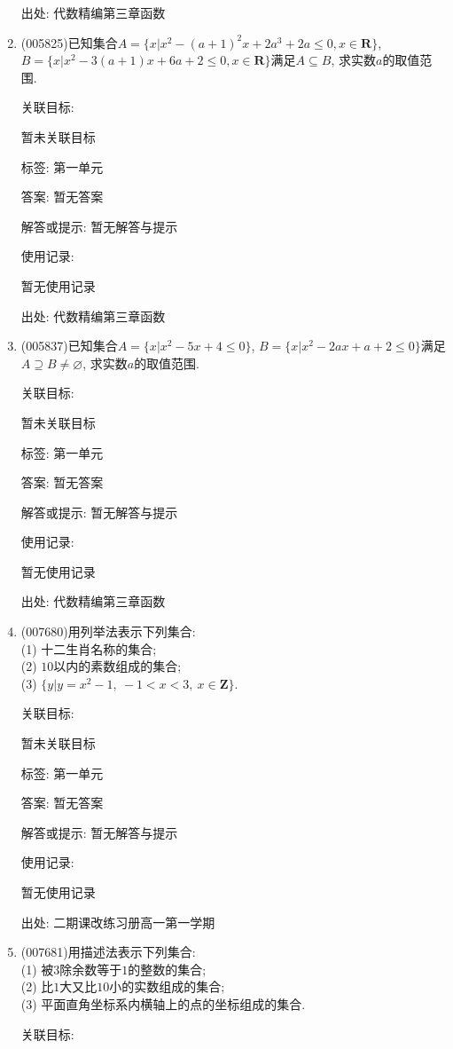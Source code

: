 \documentclass[10pt,a4paper]{article}
\begin{document}
\begin{enumerate}[1.]
出处: 代数精编第三章函数
\item { (005825)}已知集合$A=\{x|x^2-(a+1)^2x+2a^3+2a\le 0,x\in \mathbf{R}\}$, $B=\{x|x^2-3(a+1)x+6a+2\le 0,x\in \mathbf{R}\}$满足$A\subseteq B$, 求实数$a$的取值范围.


关联目标:

暂未关联目标



标签: 第一单元

答案: 暂无答案

解答或提示: 暂无解答与提示

使用记录:

暂无使用记录


出处: 代数精编第三章函数
\item { (005837)}已知集合$A=\{x|x^2-5x+4\le 0\}$, $B=\{x|x^2-2ax+a+2\le 0\}$满足$A\supseteq B\ne \varnothing$, 求实数$a$的取值范围.


关联目标:

暂未关联目标



标签: 第一单元

答案: 暂无答案

解答或提示: 暂无解答与提示

使用记录:

暂无使用记录


出处: 代数精编第三章函数
\item { (007680)}用列举法表示下列集合:\\
(1) 十二生肖名称的集合;\\
(2) $10$以内的素数组成的集合;\\
(3) $\{y|y=x^2-1, \ -1<x<3, \ x\in \mathbf{Z}\}$.


关联目标:

暂未关联目标



标签: 第一单元

答案: 暂无答案

解答或提示: 暂无解答与提示

使用记录:

暂无使用记录


出处: 二期课改练习册高一第一学期
\item { (007681)}用描述法表示下列集合:\\
(1) 被$3$除余数等于$1$的整数的集合;\\
(2) 比$1$大又比$10$小的实数组成的集合;\\
(3) 平面直角坐标系内横轴上的点的坐标组成的集合.


关联目标:


\end{enumerate}
\end{document}
